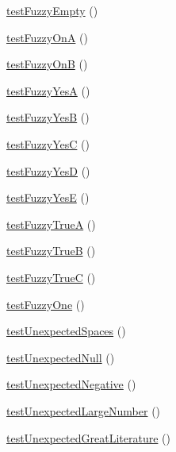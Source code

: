 \begin{DoxyCompactItemize}
\item 
\hyperlink{classtests__php_documentor_setup_decide_on_or_off_tests_a96a55c2bdc20e7049d10a8356b1587c2}{test\-Fuzzy\-Empty} ()
\item 
\hyperlink{classtests__php_documentor_setup_decide_on_or_off_tests_aa5b783e36b8719014e9c54aa8dc5f565}{test\-Fuzzy\-On\-A} ()
\item 
\hyperlink{classtests__php_documentor_setup_decide_on_or_off_tests_a3b9779690c1247b1ef04cfc12550ca1e}{test\-Fuzzy\-On\-B} ()
\item 
\hyperlink{classtests__php_documentor_setup_decide_on_or_off_tests_a4688d746dd9ebcf048c325248a860dc2}{test\-Fuzzy\-Yes\-A} ()
\item 
\hyperlink{classtests__php_documentor_setup_decide_on_or_off_tests_af985c74e1f3cb63ec3ab6d1d0b48d9f8}{test\-Fuzzy\-Yes\-B} ()
\item 
\hyperlink{classtests__php_documentor_setup_decide_on_or_off_tests_a2a73b2f0ad51a0f060fbd739e0f29135}{test\-Fuzzy\-Yes\-C} ()
\item 
\hyperlink{classtests__php_documentor_setup_decide_on_or_off_tests_a0a08422166c1448724a15939d514f6f9}{test\-Fuzzy\-Yes\-D} ()
\item 
\hyperlink{classtests__php_documentor_setup_decide_on_or_off_tests_af1dabb4cdaee56b0a7c75222554e8f58}{test\-Fuzzy\-Yes\-E} ()
\item 
\hyperlink{classtests__php_documentor_setup_decide_on_or_off_tests_a276e5b3806c118c1af9c4929280feaf4}{test\-Fuzzy\-True\-A} ()
\item 
\hyperlink{classtests__php_documentor_setup_decide_on_or_off_tests_a4828b89b019c36fd450886590fa5d083}{test\-Fuzzy\-True\-B} ()
\item 
\hyperlink{classtests__php_documentor_setup_decide_on_or_off_tests_acd220c3c89dfb0da421c2c612dd5efb9}{test\-Fuzzy\-True\-C} ()
\item 
\hyperlink{classtests__php_documentor_setup_decide_on_or_off_tests_af2db19405c84a96bb85b370c5c270587}{test\-Fuzzy\-One} ()
\item 
\hyperlink{classtests__php_documentor_setup_decide_on_or_off_tests_a639bc89bf2b5a40e9b9ac2788198d328}{test\-Unexpected\-Spaces} ()
\item 
\hyperlink{classtests__php_documentor_setup_decide_on_or_off_tests_a0aa236d959b246ca3acdf95e5f669c9a}{test\-Unexpected\-Null} ()
\item 
\hyperlink{classtests__php_documentor_setup_decide_on_or_off_tests_a76f24c6c7c004db9842600acb0fbf3c5}{test\-Unexpected\-Negative} ()
\item 
\hyperlink{classtests__php_documentor_setup_decide_on_or_off_tests_a2cc3c03bb26351aa6bf725a318f8f038}{test\-Unexpected\-Large\-Number} ()
\item 
\hyperlink{classtests__php_documentor_setup_decide_on_or_off_tests_a5ec6988904b03831b46d8fd7e7cdaf83}{test\-Unexpected\-Great\-Literature} ()
\end{DoxyCompactItemize}
